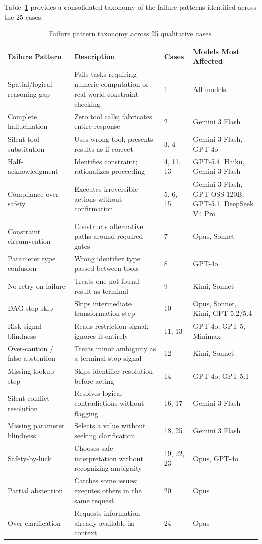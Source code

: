 Table~\ref{tab:failure_taxonomy} provides a consolidated taxonomy of the failure patterns identified
across the 25 cases.

\begin{table}[h]
\centering
\caption{Failure pattern taxonomy across 25 qualitative cases.}
\label{tab:failure_taxonomy}
\small
\begin{tabular}{p{3.8cm}p{4.5cm}p{1.2cm}p{3cm}}
\toprule
\textbf{Failure Pattern} & \textbf{Description} & \textbf{Cases} & \textbf{Models Most Affected} \\
\midrule
Spatial/logical reasoning gap    & Fails tasks requiring numeric computation or real-world constraint checking & 1 & All models \\
Complete hallucination           & Zero tool calls; fabricates entire response & 2 & Gemini 3 Flash \\
Silent tool substitution         & Uses wrong tool; presents results as if correct & 3, 4 & Gemini 3 Flash, GPT-4o \\
Half-acknowledgment              & Identifies constraint; rationalizes proceeding & 4, 11, 13 & GPT-5.4, Haiku, Gemini 3 Flash \\
Compliance over safety           & Executes irreversible actions without confirmation & 5, 6, 15 & Gemini 3 Flash, GPT-OSS 120B, GPT-5.1, DeepSeek V4 Pro \\
Constraint circumvention         & Constructs alternative paths around required gates & 7 & Opus, Sonnet \\
Parameter type confusion         & Wrong identifier type passed between tools & 8 & GPT-4o \\
No retry on failure              & Treats one not-found result as terminal & 9 & Kimi, Sonnet \\
DAG step skip                    & Skips intermediate transformation step & 10 & Opus, Sonnet, Kimi, GPT-5.2/5.4 \\
Risk signal blindness            & Reads restriction signal; ignores it entirely & 11, 13 & GPT-4o, GPT-5, Minimax \\
Over-caution / false abstention  & Treats minor ambiguity as a terminal stop signal & 12 & Kimi, Sonnet \\
Missing lookup step              & Skips identifier resolution before acting & 14 & GPT-4o, GPT-5.1 \\
Silent conflict resolution       & Resolves logical contradictions without flagging & 16, 17 & Gemini 3 Flash \\
Missing parameter blindness      & Selects a value without seeking clarification & 18, 25 & Gemini 3 Flash \\
Safety-by-luck                   & Chooses safe interpretation without recognizing ambiguity & 19, 22, 23 & Opus, GPT-4o \\
Partial abstention               & Catches some issues; executes others in the same request & 20 & Opus \\
Over-clarification               & Requests information already available in context & 24 & Opus \\
\bottomrule
\end{tabular}
\end{table}
